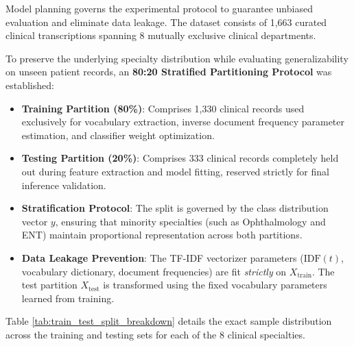 Model planning governs the experimental protocol to guarantee unbiased evaluation and eliminate data leakage. The dataset consists of 1,663 curated clinical transcriptions spanning 8 mutually exclusive clinical departments.

To preserve the underlying specialty distribution while evaluating generalizability on unseen patient records, an \textbf{80:20 Stratified Partitioning Protocol} was established:
\begin{itemize}
    \item \textbf{Training Partition (80\%)}: Comprises 1,330 clinical records used exclusively for vocabulary extraction, inverse document frequency parameter estimation, and classifier weight optimization.
    \item \textbf{Testing Partition (20\%)}: Comprises 333 clinical records completely held out during feature extraction and model fitting, reserved strictly for final inference validation.
    \item \textbf{Stratification Protocol}: The split is governed by the class distribution vector $y$, ensuring that minority specialties (such as Ophthalmology and ENT) maintain proportional representation across both partitions.
    \item \textbf{Data Leakage Prevention}: The TF-IDF vectorizer parameters ($\text{IDF}(t)$, vocabulary dictionary, document frequencies) are fit \textit{strictly} on $X_{\text{train}}$. The test partition $X_{\text{test}}$ is transformed using the fixed vocabulary parameters learned from training.
\end{itemize}

Table \ref{tab:train_test_split_breakdown} details the exact sample distribution across the training and testing sets for each of the 8 clinical specialties.

\begin{table}[H]
\centering
\small
{}
\caption{Stratified Training and Testing Split Distribution across 8 Clinical Specialties}
\label{tab:train_test_split_breakdown}
\end{table}


